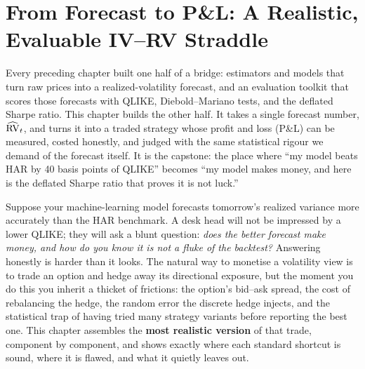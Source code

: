 \chapter{From Forecast to P\&L: A Realistic, Evaluable IV--RV Straddle}
\label{ch:ivrv-straddle}

\begin{application}
Every preceding chapter built one half of a bridge: estimators and models that turn raw prices into a realized-volatility forecast, and an evaluation toolkit that scores those forecasts with QLIKE, Diebold--Mariano tests, and the deflated Sharpe ratio.
This chapter builds the other half. It takes a single forecast number, $\widehat{\operatorname{RV}}_t$, and turns it into a traded strategy whose profit and loss (P\&L) can be measured, costed honestly, and judged with the same statistical rigour we demand of the forecast itself.
It is the capstone: the place where ``my model beats HAR by 40 basis points of QLIKE'' becomes ``my model makes money, and here is the deflated Sharpe ratio that proves it is not luck.''
\end{application}

Suppose your machine-learning model forecasts tomorrow's realized variance more accurately than the HAR benchmark. A desk head will not be impressed by a lower QLIKE; they will ask a blunt question: \emph{does the better forecast make money, and how do you know it is not a fluke of the backtest?} Answering honestly is harder than it looks. The natural way to monetise a volatility view is to trade an option and hedge away its directional exposure, but the moment you do this you inherit a thicket of frictions: the option's bid--ask spread, the cost of rebalancing the hedge, the random error the discrete hedge injects, and the statistical trap of having tried many strategy variants before reporting the best one. This chapter assembles the \textbf{most realistic version} of that trade, component by component, and shows exactly where each standard shortcut is sound, where it is flawed, and what it quietly leaves out.

